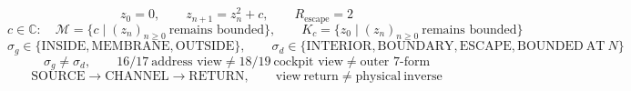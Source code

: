 \[
  z_0=0,\qquad z_{n+1}=z_n^2+c,\qquad R_{\mathrm{escape}}=2
\]
\[
  c\in\mathbb{C}:\quad
  \mathcal{M}=\{c\mid (z_n)_{n\ge 0}\ \text{remains bounded}\},\qquad
  K_c=\{z_0\mid (z_n)_{n\ge 0}\ \text{remains bounded}\}
\]
\[
  \sigma_g\in\{\mathrm{INSIDE},\mathrm{MEMBRANE},\mathrm{OUTSIDE}\},\qquad
  \sigma_d\in\{\mathrm{INTERIOR},\mathrm{BOUNDARY},\mathrm{ESCAPE},\mathrm{BOUNDED\ AT}\ N\}
\]
\[
  \sigma_g\ne\sigma_d,\qquad
  16/17\ \text{address view}\ne 18/19\ \text{cockpit view}\ne\text{outer 7-form}
\]
\[
  \mathrm{SOURCE}\rightarrow\mathrm{CHANNEL}\rightarrow\mathrm{RETURN},\qquad
  \mathrm{view\ return}\ne\mathrm{physical\ inverse}
\]
